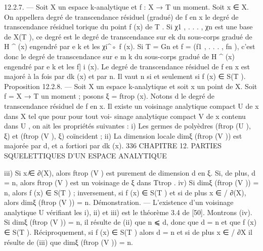 \documentclass[
  10pt,
]{article}
\newenvironment{Shaded}{}{}
\newcommand{\NormalTok}[1]{#1}
\begin{document}
\begin{Shaded}
\begin{Highlighting}[]
\NormalTok{12.2.7. — Soit X un espace k{-}analytique et f : X → T un moment. Soit x ∈ X. On}
\NormalTok{appellera degré de transcendance résiduel (gradué) de f en x le degré de transcendance}
\NormalTok{résiduel torique du point f (x) de T . Si χ1 , . . . , χn est une base de X(T ), ce degré est}
\NormalTok{le degré de transcendance sur ek du sous{-}corps gradué de H         \^{}  (x) engendré par e}
\NormalTok{                                                                                       k et les}
\NormalTok{χi\^{}◦ f (x). Si T = Gn et f = (f1 , . . . , fn ), c’est donc le degré de transcendance sur e}
\NormalTok{                     m                                                                    k du}
\NormalTok{sous{-}corps gradué de H \^{} (x) engendré par e k et les f]}
\NormalTok{                                                      i (x).}
\NormalTok{   Le degré de transcendance résiduel de f en x est majoré à la fois par dk (x) et par n.}
\NormalTok{Il vaut n si et seulement si f (x) ∈ S(T ).}
\NormalTok{Proposition 12.2.8. — Soit X un espace k{-}analytique et soit x un point de X. Soit}
\NormalTok{f = X → T un moment ; posons ξ = ftrop (x). Notons d le degré de transcendance}
\NormalTok{résiduel de f en x.}
\NormalTok{   Il existe un voisinage analytique compact U de x dans X tel que pour pour tout voi{-}}
\NormalTok{sinage analytique compact V de x contenu dans U , on ait les propriétés suivantes :}
\NormalTok{   i) Les germes de polyèdres (ftrop (U ), ξ) et (ftrop (V ), ξ) coïncident ;}
\NormalTok{   ii) La dimension locale dimξ (ftrop (V )) est majorée par d, et a fortiori par dk (x).}
\NormalTok{336           CHAPITRE 12. PARTIES SQUELETTIQUES D’UN ESPACE ANALYTIQUE}

\NormalTok{   iii) Si x ̸∈ ∂(X), alors ftrop (V ) est purement de dimension d en ξ. Si, de plus, d = n,}
\NormalTok{alors ftrop (V ) est un voisinage de ξ dans Ttrop .}
\NormalTok{   iv) Si dimξ (ftrop (V )) = n, alors f (x) ∈ S(T ) ; inversement, si f (x) ∈ S(T ) et si de}
\NormalTok{plus x ∈ / ∂(X), alors dimξ (ftrop (V )) = n.}
\NormalTok{Démonstration. — L’existence d’un voisinage analytique U vérifiant les i), ii) et iii) est}
\NormalTok{le théorème 3.4 de [50]. Montrons (iv). Si dimξ (ftrop (V )) = n, il résulte de (ii) que n ⩽ d,}
\NormalTok{donc que d = n et que f (x) ∈ S(T ). Réciproquement, si f (x) ∈ S(T ) alors d = n et si}
\NormalTok{de plus x ∈}
\NormalTok{          / ∂X il résulte de (iii) que dimξ (ftrop (V )) = n.}


\end{Highlighting}
\end{Shaded}
\end{document}
